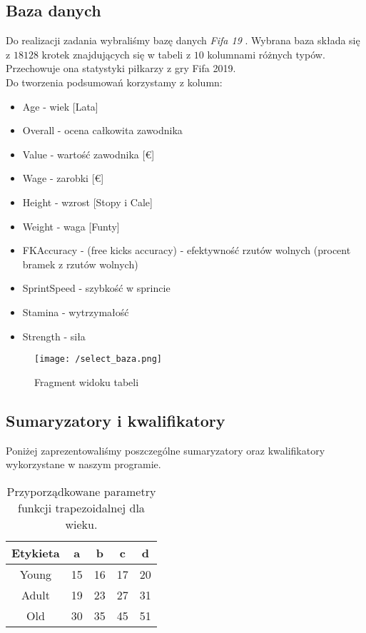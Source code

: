 \documentclass{classrep}
\begin{document}
\subsection{Baza danych}
Do realizacji zadania wybraliśmy bazę danych \emph{Fifa 19} \cite{data}. Wybrana baza
składa się z \(18128\) krotek znajdujących się w tabeli z \(10\) kolumnami różnych typów. Przechowuje ona statystyki piłkarzy z gry Fifa 2019.\\ Do tworzenia podsumowań
korzystamy z kolumn:
\begin{itemize}
    \item Age - wiek [Lata]
    \item Overall - ocena całkowita zawodnika
    \item Value - wartość zawodnika [\euro]
    \item Wage - zarobki [\euro]
    \item Height - wzrost [Stopy i Cale]
    \item Weight - waga [Funty]
    \item FKAccuracy - (free kicks accuracy) - efektywność rzutów wolnych (procent bramek z rzutów wolnych)
    \item SprintSpeed - szybkość w sprincie
    \item Stamina - wytrzymałość
    \item Strength - siła
\end{itemize}

\begin{figure}[H]
    \centering
    \texttt{[image: /select\_baza.png]}
    \caption{Fragment widoku tabeli}
\end{figure}
\subsection{Sumaryzatory i kwalifikatory}
Poniżej zaprezentowaliśmy poszczególne sumaryzatory oraz kwalifikatory wykorzystane w naszym programie. 

\begin{table}[H]
	\centering
	\begin{tabular}{c c c c c} 
		\hline
		\textbf{Etykieta} & \textbf{a} & \textbf{b} & \textbf{c} &  \textbf{d} \\ [0.5ex] 
		\hline
		\hline 
		Young & 15 & 16 & 17 & 20 \\ 
		Adult & 19 &  23 &  27 &  31 \\
		Old &  30 &  35 &  45 &  51 \\
		\hline
	\end{tabular}
	\caption{Przyporządkowane parametry funkcji trapezoidalnej dla wieku.}
\end{table}
\end{document}
